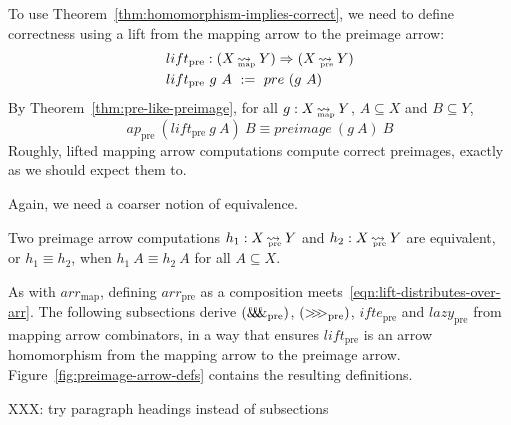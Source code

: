 \documentclass[preprint]{sigplanconf}
\newcommand{\arrow}{\rightsquigarrow}
\newcommand{\arrowlift}{\ensuremath{lift}}
\newcommand{\arrowarr}{\ensuremath{arr}}
\newcommand{\arrowcomp}{\ensuremath{{>}\mspace{-6mu}{>}\mspace{-6mu}{>}}}
\newcommand{\arrowpair}{\ensuremath{\mathit{\&\mspace{-7.5mu}\&\mspace{-7.5mu}\&}}}
\newcommand{\arrowif}{\ensuremath{ifte}}
\newcommand{\arrowlazy}{\ensuremath{lazy}}
\newcommand{\map}{_\mathrm{map}}
\DeclareMathOperator{\mapto}{\arrow_{\mspace{-21mu}\map}}
\newcommand{\arrmap}{\arrowarr\map}
\newcommand{\pre}{_\mathrm{pre}}
\DeclareMathOperator{\preto}{\arrow_{\mspace{-19mu}\pre}}
\newcommand{\liftpre}{\arrowlift\pre}
\newcommand{\arrpre}{\arrowarr\pre}
\newcommand{\comppre}{\arrowcomp\pre}
\newcommand{\pairpre}{\arrowpair\pre}
\newcommand{\ifpre}{\arrowif\pre}
\newcommand{\lazypre}{\arrowlazy\pre}
\begin{document}
To use Theorem~\ref{thm:homomorphism-implies-correct}, we need to define correctness using a lift from the mapping arrow to the preimage arrow:
\begin{equation}
\begin{aligned}
	&\liftpre : (X \mapto Y) \tto (X \preto Y) \\
	&\liftpre~g~A \ := \ pre~(g~A)
\end{aligned}
\end{equation}
By Theorem~\ref{thm:pre-like-preimage}, for all $g : X \mapto Y$, $A \subseteq X$ and $B \subseteq Y$,
\begin{equation}
	ap\pre~(\liftpre~g~A)~B \equiv preimage~(g~A)~B
\end{equation}
Roughly, lifted mapping arrow computations compute correct preimages, exactly as we should expect them to.

Again, we need a coarser notion of equivalence.

\begin{definition}
Two preimage arrow computations $h_1 : X \preto Y$ and $h_2 : X \preto Y$ are equivalent, or $h_1 \equiv h_2$, when 
$h_1~A \equiv h_2~A$ for all $A \subseteq X$.
\end{definition}

As with $\arrmap$, defining $\arrpre$ as a composition meets~\eqref{eqn:lift-distributes-over-arr}.
The following subsections derive $(\pairpre)$, $(\comppre)$, $\ifpre$ and $\lazypre$ from mapping arrow combinators, in a way that ensures $\liftpre$ is an arrow homomorphism from the mapping arrow to the preimage arrow. Figure~\ref{fig:preimage-arrow-defs} contains the resulting definitions.

XXX: try paragraph headings instead of subsections
\end{document}
